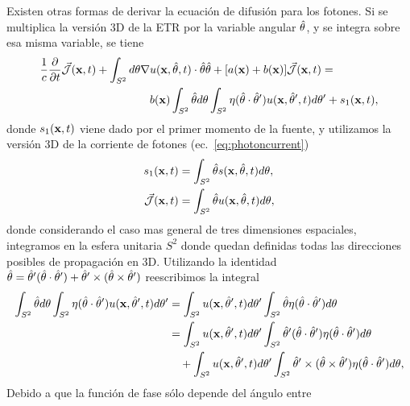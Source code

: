 Existen otras formas de derivar la ecuación de difusión para los fotones. 
Si se multiplica la versión 3D de la ETR  por la variable angular $\hat{\theta}$, y se integra 
sobre esa misma variable, se tiene
\begin{equation}
\begin{split}
\begin{aligned}
\frac{1}{c}\frac{\partial}{\partial t} \vec{ \mathcal{J}}(\mathbf{x},t)+\int_{S^2} d\theta \nabla & u(\mathbf{x},\hat{\theta},t) \cdot \hat{\theta} \hat{\theta} 
+[a(\mathbf{x})+b(\mathbf{x})]\vec{ \mathcal{J}}(\mathbf{x},t)=\\
&b(\mathbf{x})\int_{S^2} \hat{\theta} d\theta \int_{S^2} \eta(\hat{\theta} \cdot \hat{\theta}')  u(\mathbf{x},\hat{\theta}',t) d\theta' + s_1(\mathbf{x},t),
\end{aligned}
\end{split}
\label{eq:RTEjflux}
\end{equation}
donde $s_1(\mathbf{x},t)$ viene dado por el primer momento de la fuente, y utilizamos 
la versión 3D de la corriente de fotones (ec.~\eqref{eq:photoncurrent})
\begin{equation}
\begin{split}
\begin{aligned}
s_1(\mathbf{x},t)&=\int_{S^2} \hat{\theta} s(\mathbf{x},\hat{\theta},t) d\theta,\\
 \vec{ \mathcal{J}}(\mathbf{x},t)&=\int_{S^2} \hat{\theta} u(\mathbf{x},\hat{\theta},t) d\theta,
\label{eq:RTEsflux1}
\end{aligned}
\end{split}
\end{equation}
donde considerando el caso mas general de tres dimensiones espaciales, integramos en la esfera unitaria $S^2$ donde quedan definidas todas las direcciones posibles de propagación en 3D. 
Utilizando la identidad $\hat{\theta}= \hat{\theta}'(\hat{\theta}\cdot \hat{\theta}') + \hat{\theta}' \times(\hat{\theta} \times \hat{\theta}')$ reescribimos la integral
\begin{equation}
\begin{split}
\begin{aligned}
\int_{S^2} \hat{\theta} d\theta \int_{S^2} \eta(\hat{\theta} \cdot \hat{\theta}')  u(\mathbf{x},\hat{\theta}',t) d\theta' 
&=\int_{S^2} u(\mathbf{x},\hat{\theta}',t) d\theta'  \int_{S^2} \hat{\theta} \eta(\hat{\theta} \cdot \hat{\theta}') d\theta\\
&=\int_{S^2} u(\mathbf{x},\hat{\theta}',t) d\theta' \int_{S^2} \hat{\theta}' (\hat{\theta} \cdot \hat{\theta}') \eta(\hat{\theta} \cdot \hat{\theta}') d\theta \\&\quad+ \int_{S^2} u(\mathbf{x},\hat{\theta}',t) d\theta' \int_{S^2}  \hat{\theta}' \times(\hat{\theta} \times \hat{\theta}') \eta(\hat{\theta} \cdot \hat{\theta}') d\theta ,
\end{aligned}
\end{split}
\label{eq:RTEjint}
\end{equation}
Debido a que la función de fase sólo depende del ángulo entre 
